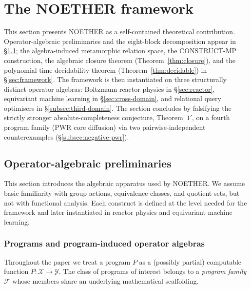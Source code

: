 \documentclass[acmsmall, screen]{acmart}
\begin{document}

\section{The NOETHER framework}
\label{sec:noether-framework}

This section presents NOETHER as a self-contained theoretical contribution. Operator-algebraic preliminaries and the eight-block decomposition appear in \S\ref{sec:prelim}; the algebra-induced metamorphic relation space, the CONSTRUCT-MP construction, the algebraic closure theorem (Theorem~\ref{thm:closure}), and the polynomial-time decidability theorem (Theorem~\ref{thm:decidable}) in \S\ref{sec:framework}. The framework is then instantiated on three structurally distinct operator algebras: Boltzmann reactor physics in \S\ref{sec:reactor}, equivariant machine learning in \S\ref{sec:cross-domain}, and relational query optimisers in \S\ref{subsec:third-domain}. The section concludes by falsifying the strictly stronger absolute-completeness conjecture, Theorem~$1'$, on a fourth program family (PWR core diffusion) via two pairwise-independent counterexamples (\S\ref{subsec:negative-pwr}).

\subsection{Operator-algebraic preliminaries}
\label{sec:prelim}

This section introduces the algebraic apparatus used by NOETHER. We assume basic familiarity with group actions, equivalence classes, and quotient sets, but not with functional analysis. Each construct is defined at the level needed for the framework and later instantiated in reactor physics and equivariant machine learning.

\subsubsection{Programs and program-induced operator algebras}

Throughout the paper we treat a program $P$ as a (possibly partial) computable function $P: \mathcal{X} \to \mathcal{Y}$. The class of programs of interest belongs to a \emph{program family} $\mathcal{F}$ whose members share an underlying mathematical scaffolding.
\end{document}
